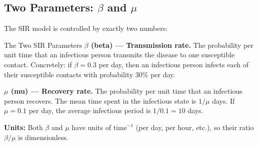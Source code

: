 \begin{center}
\end{center}

\subsection{Two Parameters: $\beta$ and $\mu$}

The SIR model is controlled by exactly two numbers:

\begin{conceptbox}{The Two SIR Parameters}
\textbf{$\beta$ (beta) --- Transmission rate.}
The probability per unit time that an infectious person transmits the disease to one susceptible contact. Concretely: if $\beta = 0.3$ per day, then an infectious person infects each of their susceptible contacts with probability $30\%$ per day.

\medskip
\textbf{$\mu$ (mu) --- Recovery rate.}
The probability per unit time that an infectious person recovers. The mean time spent in the infectious state is $1/\mu$ days. If $\mu = 0.1$ per day, the average infectious period is $1/0.1 = 10$ days.

\medskip
\textbf{Units:} Both $\beta$ and $\mu$ have units of $\text{time}^{-1}$ (per day, per hour, etc.), so their ratio $\beta/\mu$ is dimensionless.
\end{conceptbox}

